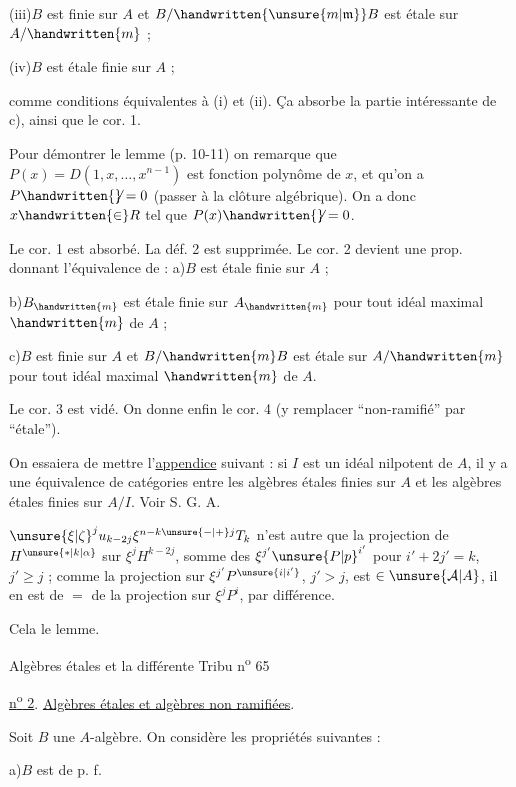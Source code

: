 (iii)\qquad $B$ est finie sur $A$ et $B/\handwritten{\unsure{m|\mathfrak{m}}}B$ est étale sur $A/\handwritten{m}$ ;

(iv)\qquad $B$ est étale finie sur $A$ ;

comme conditions équivalentes à (i) et (ii). Ça absorbe la partie intéressante de c),
ainsi que le cor. 1.

Pour démontrer le lemme (p. 10-11) on remarque que $P(x)=D(1,x,\ldots,x^{n-1})$ est
fonction polynôme de $x$, et qu'on a $P\handwritten{\not}=0$ (passer à la clôture algébrique). On a
donc $x\handwritten{\in}R$ tel que $P(x)\handwritten{\not}=0$.

Le cor. 1 est absorbé. La déf. 2 est supprimée. Le cor. 2 devient une prop. donnant
l'équivalence de : a)\quad $B$ est étale finie sur $A$ ;

b)\quad $B_{\handwritten{m}}$ est étale finie sur $A_{\handwritten{m}}$ pour tout idéal maximal $\handwritten{m}$ de $A$ ;

c)\quad $B$ est finie sur $A$ et $B/\handwritten{m}B$ est étale sur $A/\handwritten{m}$ pour tout
idéal maximal $\handwritten{m}$ de $A$.

Le cor. 3 est vidé. On donne enfin le cor. 4 (y remplacer ``non-ramifié'' par
``étale'').

On essaiera de mettre l'\uline{appendice} suivant : si $I$ est un idéal nilpotent de $A$,
il y a une équivalence de catégories entre les algèbres étales finies sur $A$ et les
algèbres étales finies sur $A/I$. Voir S. G. A.

$\unsure{\xi|\zeta}^{j}u_{k-2j}\xi^{n-k\unsure{-|+}j}T_k$ n'est autre que la
projection de $H^{\unsure{*|k|\alpha}}$ sur $\xi^j H^{k-2j}$, somme des
$\xi^{j'}\unsure{P|p}^{i'}$ pour $i'+2j'=k$, $j'\geq j$ ;  comme
la projection   sur $\xi^{j'}P^{\unsure{i|i'}}$,
$j'>j$, est $\in\unsure{\mathcal{A}|A}$, il en est de $=$ de
la projection sur $\xi^j P^i$, par différence.

Cela  le lemme.

Algèbres étales et la différente \hfill Tribu n\textsuperscript{o} 65

\uline{n\textsuperscript{o} 2}. \uline{Algèbres étales et algèbres non ramifiées}.

Soit $B$ une $A$-algèbre. On considère les propriétés suivantes :

a)\quad $B$ est de p. f.

